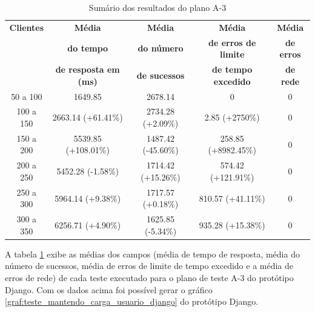   \begin{table}[H]
    \centering
    \footnotesize
    \setlength{\abovecaptionskip}{0pt}
    \setlength{\belowcaptionskip}{0pt}
    \caption[Sumário dos resultados do plano A-3]{Sumário dos resultados do plano A-3}
    \label{tab:sumario-resultado-plano-teste-a-3}
    \begin{tabular}{c|c|c|c|c}
      \hline \hline
      \textbf{Clientes} & \textbf{Média} &	\textbf{Média} & \textbf{Média} & \textbf{Média}  \\
      {}		& \textbf{do tempo} &   \textbf{do número } & \textbf{de erros de limite} & \textbf{de erros}  \\
      {}		& \textbf{de resposta em (ms) } &\textbf{de sucessos } & \textbf{de tempo excedido} & \textbf{de rede} \\
      \hline \hline
      50 a 100 &		1649.85 &			2678.14 & 			0 &				0 \\
      100 a 150&		2663.14 (+61.41\%)&		2734.28 (+2.09\%)& 		2.85 (+2750\%) &		0 \\
      150 a 200&		5539.85 (+108.01\%)&		1487.42 (-45.60\%)& 		258.85 (+8982.45\%) &		0 \\
      200 a 250&		5452.28 (-1.58\%)&		1714.42 (+15.26\%)& 		574.42 (+121.91\%) &		0 \\
      250 a 300&		5964.14 (+9.38\%)&		1717.57 (+0.18\%)& 		810.57 (+41.11\%) &		0 \\
      300 a 350&		6256.71 (+4.90\%)&		1625.85 (-5.34\%)& 		935.28 (+15.38\%) &		0 \\
      \hline \hline
    \end{tabular}
  \end{table}

  A tabela \ref{tab:sumario-resultado-plano-teste-a-3} exibe as médias dos campos (média de tempo de resposta,
  média do número de sucessos, média de erros de limite de tempo excedido e a média de erros de rede) de cada teste executado
  para o plano de teste A-3 do protótipo Django.
  Com os dados acima foi possível gerar o gráfico \ref{graf:teste_mantendo_carga_usuario_django} do
  protótipo Django.

